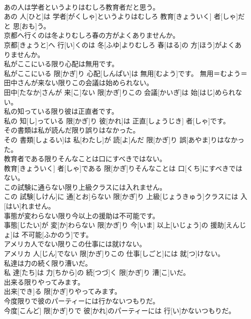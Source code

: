 \documentclass[8pt]{extreport}
\begin{document}
\begin{CJK}{UTF8}{min}
\\	あの人は学者というよりはむしろ教育者だと思う。	
\\	あの 人[ひと]は 学者[がくしゃ]というよりはむしろ 教育[きょういく] 者[しゃ]だと 思[おも]う。	
\\	京都へ行くのは冬よりむしろ春の方がよくありませんか。	
\\	京都[きょうと]へ 行[い]くのは 冬[ふゆ]よりむしろ 春[はる]の 方[ほう]がよくありませんか。	
\\	私がここにいる限り心配は無用です。	
\\	私がここにいる 限[かぎ]り 心配[しんぱい]は 無用[むよう]です。	無用＝むよう＝ 
\\	田中さんが来ない限りこの会議は始められない。	
\\	田中[たなか]さんが 来[こ]ない 限[かぎ]りこの 会議[かいぎ]は 始[はじ]められない。	
\\	私の知っている限り彼は正直者です。	
\\	私の 知[し]っている 限[かぎ]り 彼[かれ]は 正直[しょうじき] 者[しゃ]です。	
\\	その書類は私が読んだ限り誤りはなかった。	
\\	その 書類[しょるい]は 私[わたし]が 読[よ]んだ 限[かぎ]り 誤[あやま]りはなかった。	
\\	教育者である限りそんなことは口にすべきではない。	
\\	教育[きょういく] 者[しゃ]である 限[かぎ]りそんなことは 口[くち]にすべきではない。	
\\	この試験に通らない限り上級クラスには入れません。	
\\	この 試験[しけん]に 通[とお]らない 限[かぎ]り 上級[じょうきゅう]クラスには 入[はい]れません。	
\\	事態が変わらない限り今以上の援助は不可能です。	
\\	事態[じたい]が 変[か]わらない 限[かぎ]り 今[いま] 以上[いじょう]の 援助[えんじょ]は 不可能[ふかのう]です。	
\\	アメリカ人でない限りこの仕事には就けない。	
\\	アメリカ 人[じん]でない 限[かぎ]りこの 仕事[しごと]には 就[つ]けない。	
\\	私達は力の続く限り漕いだ。	
\\	私 達[たち]は 力[ちから]の 続[つづ]く 限[かぎ]り 漕[こ]いだ。	
\\	出来る限りやってみます。	
\\	出来[でき]る 限[かぎ]りやってみます。	
\\	今度限りで彼のパーティーには行かないつもりだ。	
\\	今度[こんど] 限[かぎ]りで 彼[かれ]のパーティーには 行[い]かないつもりだ。	

\end{CJK}
\end{document}
